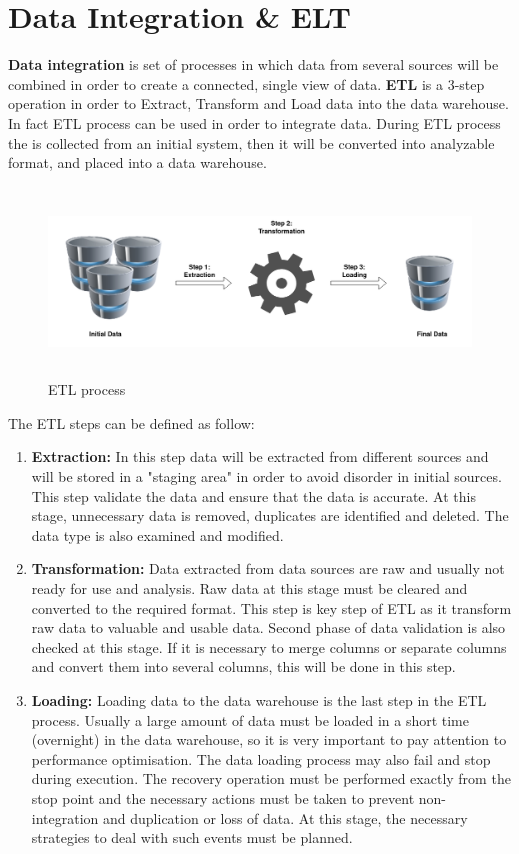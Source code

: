 \documentclass{article}
\newcommand\bld[1]{\textbf{#1}}
\begin{document}
\section {Data Integration \& ELT}
\bld{Data integration} is set of processes in which data from several sources will be combined in order to create a connected, single view of data. \bld{ETL} is a 3-step operation in order to Extract, Transform and Load data into the data warehouse. In fact ETL process can be used in order to integrate data. During ETL process the is collected from an initial system, then it will be converted into analyzable format, and placed into a data warehouse. 

\vspace{0.5cm}
\begin{figure}[H] 
\begin{center}
\includegraphics[width=15cm, height=5cm]{images2/etl.png}
\end{center}
\caption{ETL process}
\label{etl}
\end{figure}


The ETL steps can be defined as follow:
\begin{enumerate}
    \item \bld{Extraction: } In this step data will be extracted from different sources and will be stored in a "staging area" in order to avoid disorder in initial sources. This step validate the data and ensure that the data is accurate. At this stage, unnecessary data is removed, duplicates are identified and deleted. The data type is also examined and modified.
    \item \bld{Transformation: } Data extracted from data sources are raw and usually not ready for use and analysis. Raw data at this stage must be cleared and converted to the required format. This step is key step of ETL as it transform raw data to valuable and usable data. Second phase of data validation is also checked at this stage. If it is necessary to merge columns or separate columns and convert them into several columns, this will be done in this step.
    \item \bld{Loading: } Loading data to the data warehouse is the last step in the ETL process. Usually a large amount of data must be loaded in a short time (overnight) in the data warehouse, so it is very important to pay attention to performance optimisation. The data loading process may also fail and stop during execution. The recovery operation must be performed exactly from the stop point and the necessary actions must be taken to prevent non-integration and duplication or loss of data. At this stage, the necessary strategies to deal with such events must be planned. 
\end{enumerate}
\end{document}
